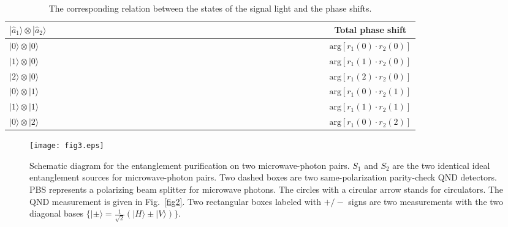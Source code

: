 \documentclass[showpacs,aps,graphicx,twocolumn]{revtex4}
\begin{document}
\begin{table}
  \begin{center}
\caption{The corresponding relation between the states of the signal
light and the phase shifts.}
\begin{tabular}{lccccccccccccccccccccccccccccccccc}
\hline\hline $|\hat{a}_{1}\rangle\otimes|\hat{a}_{2}\rangle$
&&&&&&&&&&&&&&&&&&&&&&&&&&&&&&&&& Total phase shift  \\ \hline
$|0\rangle\otimes|0\rangle$ &&&&&&&&&&&&&&&&&&&&&&&&&&&&&&&&& $\text{arg}
\left[r_{1}(0)\cdot r_{2}(0)\right]$   \\ %
$|1\rangle\otimes|0\rangle$ &&&&&&&&&&&&&&&&&&&&&&&&&&&&&&&&& $\text{arg}
\left[r_{1}(1)\cdot r_{2}(0)\right]$  \\ %
$|2\rangle\otimes|0\rangle$ &&&&&&&&&&&&&&&&&&&&&&&&&&&&&&&&& $\text{arg}
\left[r_{1}(2)\cdot r_{2}(0)\right]$  \\ %
$|0\rangle\otimes|1\rangle$ &&&&&&&&&&&&&&&&&&&&&&&&&&&&&&&&& $\text{arg}
\left[r_{1}(0)\cdot r_{2}(1)\right]$   \\ %
$|1\rangle\otimes|1\rangle$ &&&&&&&&&&&&&&&&&&&&&&&&&&&&&&&&& $\text{arg}
\left[r_{1}(1)\cdot r_{2}(1)\right]$  \\ %
$|0\rangle\otimes|2\rangle$ &&&&&&&&&&&&&&&&&&&&&&&&&&&&&&&&& $\text{arg}
\left[r_{1}(0)\cdot r_{2}(2)\right]$ \\
\hline\hline
\end{tabular}\label{Tab1}
\end{center}
\end{table}





\begin{figure*}[!ht]%
\begin{center}
\texttt{[image: fig3.eps]}
\caption{ Schematic diagram for the entanglement purification on two
microwave-photon pairs. $S_{1}$ and $S_{2}$ are the two identical
ideal entanglement sources for microwave-photon pairs. Two dashed
boxes are two same-polarization parity-check QND detectors. PBS
represents a polarizing beam splitter for microwave photons. The
circles with a circular arrow stands for circulators. The QND
measurement is given in Fig.~\ref{fig2}. Two rectangular boxes
labeled with $+/-$ signs are two measurements with the two diagonal
bases $\{|\pm\rangle=\frac{1}{\sqrt{2}}(|H\rangle\pm|V\rangle)\}$.}
\label{figepid}
\end{center}
\end{figure*}
\end{document}
